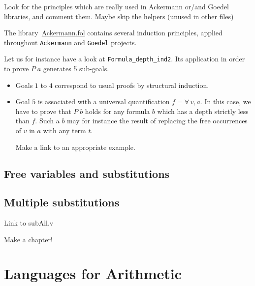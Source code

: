 
\begin{todo}
 Look for the principles which are really used in Ackermann or/and Goedel libraries, and comment them.
 Maybe skip the helpers (unused in other files)
\end{todo}

The library~\href{../theories/html/hydras.Ackermann.fol.html}{Ackermann.fol} contains several induction principles, applied 
throughout \texttt{Ackermann} and \texttt{Goedel} projects.


Let us for instance have a look  at \texttt{Formula\_depth\_ind2}. Its application in order to prove $P\;a$ generates 5 sub-goals. 


\begin{itemize}
\item Goals $1$ to $4$ correspond to  usual proofs by structural induction.
\item Goal $5$ is associated with a universal quantification $f=\forall\,v,a$. In this case, we have to prove that $P\;b$ holds for any formula $b$ which has a depth strictly less than $f$. Such a $b$ may for instance the result of replacing the free occurrences of $v$ in $a$ with any term $t$.
  \begin{todo}
   Make a link to an appropriate example.
  \end{todo}
\end{itemize}



\subsection{Free variables and substitutions}



\subsection{Multiple substitutions}

\begin{todo}
Link to subAll.v
\end{todo}

\begin{todo}
Make a chapter!
\end{todo}
\section{Languages for Arithmetic}



